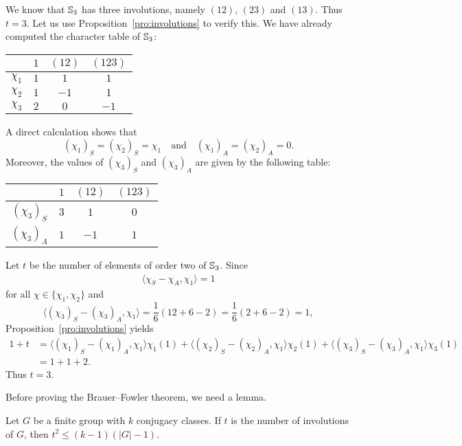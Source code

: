 \begin{example}
    We know that $\mathbb{S}_3$ has three involutions, namely $(12)$, $(23)$ and $(13)$. Thus $t=3$. 
    Let us use Proposition~\ref{pro:involutions} to verify this. 
    We have already computed the  character table
    of $\mathbb{S}_3$: 
\bigskip 
    \begin{center}
		\begin{tabular}{|c|ccc|}
			\hline
			& $1$ & $(12)$ & $(123)$ \tabularnewline
			\hline 
			$\chi_{1}$ & $1$ & $1$ & $1$\tabularnewline
			$\chi_{2}$ & $1$ & $-1$ & $1$ \tabularnewline
			$\chi_{3}$ & $2$ & $0$ & $-1$ \tabularnewline
			\hline
		\end{tabular}
	\end{center}
\bigskip 
A direct calculation shows that 
\[
(\chi_1)_S=(\chi_2)_S=\chi_1\quad\text{and}
\quad (\chi_1)_A=(\chi_2)_A=0.
\]
Moreover, the values of $(\chi_3)_S$ and $(\chi_3)_A$ 
are
given by the following table: 
\bigskip 
    \begin{center}
		\begin{tabular}{|c|ccc|}
			\hline
			& $1$ & $(12)$ & $(123)$ \tabularnewline
			\hline 
			$(\chi_{3})_S$ & $3$ & $1$ & $0$ \tabularnewline
			$(\chi_{3})_A$ & $1$ & $-1$ & $1$ \tabularnewline
			\hline
		\end{tabular}
	\end{center}
\bigskip 
Let $t$ be the number of elements 
of order two of $\mathbb{S}_3$. 
Since 
\begin{align*}
\langle\chi_S-\chi_A,\chi_1\rangle=1
\end{align*}
for all $\chi\in\{\chi_1,\chi_2\}$ and
\[
\langle (\chi_3)_S-(\chi_3)_A,\chi_1\rangle
=\frac{1}{6}(12+6-2)=\frac16(2+6-2)=1,
\]
Proposition~\ref{pro:involutions} yields 
\begin{align*} 
1+t&=\langle (\chi_1)_S-(\chi_1)_A,\chi_1\rangle\chi_1(1)
+\langle (\chi_2)_S-(\chi_2)_A,\chi_1\rangle\chi_2(1)
+\langle (\chi_3)_S-(\chi_3)_A,\chi_1\rangle\chi_3(1)\\
&=1+1+2.
\end{align*}
Thus $t=3$. 
\end{example}

Before proving the Brauer--Fowler theorem, we
need a lemma. 

\begin{lemma}
    Let $G$ be a finite group with $k$ conjugacy classes. 
    If $t$ is the number of involutions of $G$, then
    $t^2\leq (k-1)(|G|-1)$. 
\end{lemma}

